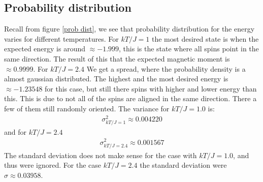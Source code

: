 \documentclass[a4paper, 10pt]{article}
\begin{document}
\subsection{Probability distribution}
Recall from figure \eqref{prob dist}, we see that probability distribution for the energy varies for different temperatures.
For $kT/J = 1$ the most desired state is when the expected energy is around $\approx -1.999$, this is the state where all spins point in the same direction.
The result of this that the expected magnetic moment is $\approx 0.9999$. For $kT/J = 2.4$ We get a spread, where the probability density is a almost gaussian distributed.
The highest and the most desired energy is $\approx -1.23548$ for this case, but still there spins with higher and lower energy than this.
This is due to not all of the spins are aligned in the same direction. There a few of them still randomly oriented.
The variance for $kT/J = 1.0$ is:
\begin{align}
  \sigma^{2}_{kT/J = 1} \approx 0.004220
\end{align}
and for $kT/J = 2.4$
\begin{align}
    \sigma^{2}_{kT/J = 2.4} \approx 0.001567
\end{align}
The standard deviation does not make sense for the case with $kT/J = 1.0$, and thus were ignored.
For the case $kT/J = 2.4$ the standard deviation were $\sigma \approx 0.03958$.
\end{document}
